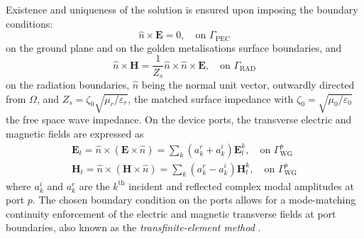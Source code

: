 \documentclass[journal,twoside,letterpaper]{IEEEtran}
\renewcommand{\vec}[1]{\mathbf{#1}}
\begin{document}
Existence and uniqueness of the solution is ensured upon imposing the boundary conditions:
%
\begin{equation}
\label{eq:bcpec}
\hat{n} \times \vec{E} = 0, \quad \text{on } \Gamma_\text{PEC}
\end{equation}
%
\noindent on the ground plane and on the golden metalisations surface boundaries, and
%
\begin{equation}
\label{eq:bcrad}
\hat{n} \times \vec{H} =  \frac{1}{Z_s} \hat{n}\times\hat{n}\times \vec{E}, \quad \text{on } \Gamma_\text{RAD}
\end{equation}
%
\noindent on the radiation boundaries, $\hat{n}$ being the normal unit vector, outwardly directed from $\Omega$, and $Z_s = \zeta_0 \sqrt{{\mu_r}/{\varepsilon_r}}$, the matched surface impedance with $\zeta_0 = \sqrt{{\mu_0}/{\varepsilon_0}}$ the free space wave impedance. On the device ports, the transverse electric and magnetic fields are expressed as
\begin{equation}
\label{eq:bcport}
\begin{aligned}
{\vec{E}}_t = \hat{n} \times ( {\vec{E}} \times \hat{n})  = \sum_{k} \left ( a_{k}^r + a_{k}^i \right ) \vec{E}_t^k, \quad \text{on } \Gamma_\text{WG}^p \\
{\vec{H}}_t = \hat{n} \times ( {\vec{H}} \times \hat{n}) = \sum_{k} \left ( a_{k}^r - a_{k}^i \right ) \vec{H}_t^k, \quad \text{on } \Gamma_\text{WG}^p
\end{aligned}
\end{equation}
\noindent where $a_k^i$ and $a_k^r$ are the $k^\text{th}$ incident and reflected complex modal amplitudes at port $p$. The chosen boundary condition on the ports allows for a mode-matching continuity enforcement of the electric and magnetic transverse fields at port boundaries, also known as the \emph{transfinite-element method} \cite{cendes1988transfinite}.
\end{document}
